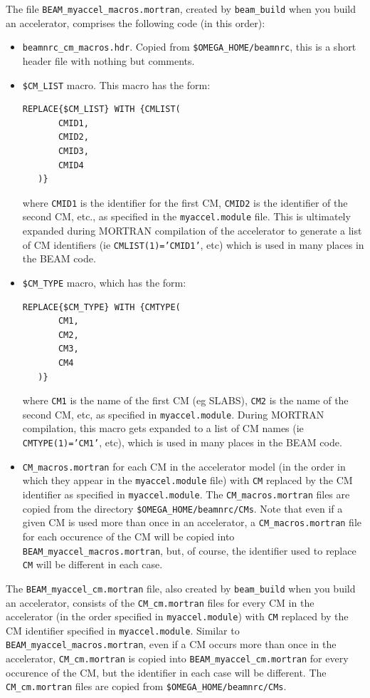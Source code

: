 \documentclass[12pt,twoside]{article}
\begin{document}
The file {\tt BEAM\_myaccel\_macros.mortran}, created by {\tt beam\_build}
when you build an accelerator, comprises the following code (in this
order):
\begin{itemize}
\item {\tt beamnrc\_cm\_macros.hdr}.  Copied from {\tt \$OMEGA\_HOME/beamnrc},
this
is a short header file with nothing but comments.
\item {\tt \$CM\_LIST} macro.  This macro has the form:
\begin{verbatim}
REPLACE{$CM_LIST} WITH {CMLIST(
       CMID1,
       CMID2,
       CMID3,
       CMID4
   )}
\end{verbatim}
where {\tt CMID1} is the identifier for the first CM, {\tt CMID2} is the
identifier of the second CM, etc., as specified in the {\tt myaccel.module}
file.  This is ultimately expanded during MORTRAN compilation of the accelerator
to generate a list of CM identifiers (ie {\tt CMLIST(1)='CMID1'}, etc)
which is used in many places in the BEAM code.
\item {\tt \$CM\_TYPE} macro, which has the form:
\begin{verbatim}
REPLACE{$CM_TYPE} WITH {CMTYPE(
       CM1,
       CM2,
       CM3,
       CM4
   )}
\end{verbatim}
where {\tt CM1} is the name of the first CM (eg SLABS), {\tt CM2} is the
name of the second CM, etc, as specified in {\tt myaccel.module}.  During
MORTRAN compilation, this macro gets expanded to a list of CM names
(ie {\tt CMTYPE(1)='CM1'}, etc), which is used in many places in the BEAM
code.
\item {\tt CM\_macros.mortran} for each CM in the accelerator model
(in the order in which they appear in the {\tt myaccel.module} file) with
{\tt CM} replaced by the CM identifier as specified in {\tt myaccel.module}.
The {\tt CM\_macros.mortran} files
are copied from the directory {\tt \$OMEGA\_HOME/beamnrc/CMs}.  Note that
even if a given CM is used more than once in an accelerator, a
{\tt CM\_macros.mortran} file for each occurence of the CM will be
copied into {\tt BEAM\_myaccel\_macros.mortran}, but, of course, the
identifier used to replace {\tt CM} will be different in each case.
\end{itemize}

The {\tt BEAM\_myaccel\_cm.mortran} file, also created by {\tt beam\_build}
when you build an accelerator, consists of the
{\tt CM\_cm.mortran} files for every CM in the accelerator
(in the order specified in {\tt myaccel.module}) with {\tt CM} replaced
by the CM identifier specified in {\tt myaccel.module}.  Similar to
{\tt BEAM\_myaccel\_macros.mortran}, even if a CM occurs more than
once in the accelerator, {\tt CM\_cm.mortran} is copied into
{\tt BEAM\_myaccel\_cm.mortran} for every occurence of the CM, but the
identifier in each case will be different.  The {\tt CM\_cm.mortran} files
are copied from {\tt \$OMEGA\_HOME/beamnrc/CMs}.
\end{document}
